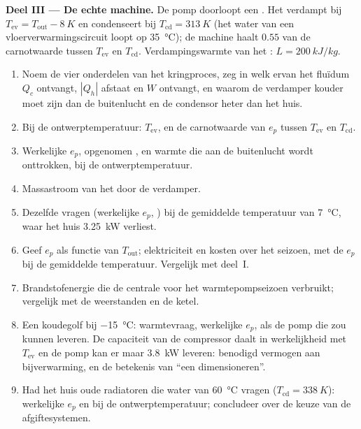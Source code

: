 \begin{problem}
\medskip
\noindent\textbf{Deel III --- De echte machine.}
De pomp doorloopt een . Het  verdampt bij
$T_{\mathrm{ev}} = T_{\mathrm{out}} - \qty{8}{K}$ en condenseert bij
$T_{\mathrm{cd}} = \qty{313}{K}$ (het water van een vloerverwarmingscircuit loopt op
\qty{35}{\degreeCelsius}); de machine haalt $0.55$ van de carnotwaarde
tussen $T_{\mathrm{ev}}$ en $T_{\mathrm{cd}}$. Verdampingswarmte van
het : $L = \qty{200}{kJ/kg}$.
\begin{enumerate}[resume]
  \item Noem de vier onderdelen van het kringproces, zeg in welk ervan het fluïdum
        $Q_c$ ontvangt, $|Q_h|$ afstaat en $W$ ontvangt, en waarom de
        verdamper kouder moet zijn dan de buitenlucht en de
        condensor heter dan het huis.
  \item Bij de ontwerptemperatuur: $T_{\mathrm{ev}}$, en de carnotwaarde van $e_p$
        tussen $T_{\mathrm{ev}}$ en $T_{\mathrm{cd}}$.
  \item Werkelijke $e_p$, opgenomen , en warmte die aan de
        buitenlucht wordt onttrokken, bij de ontwerptemperatuur.
  \item Massastroom van het  door de verdamper.
  \item Dezelfde vragen (werkelijke $e_p$, ) bij de gemiddelde
        temperatuur van \qty{7}{\degreeCelsius}, waar het huis
        \qty{3.25}{kW} verliest.
  \item Geef $e_p$ als functie van $T_{\mathrm{out}}$; elektriciteit en kosten
        over het seizoen, met de $e_p$ bij de gemiddelde temperatuur.
        Vergelijk met deel~I.
  \item Brandstofenergie die de centrale voor het warmtepompseizoen
        verbruikt; vergelijk met de weerstanden en de ketel.
  \item Een koudegolf bij \qty{-15}{\degreeCelsius}: warmtevraag, werkelijke $e_p$,
         als de pomp die zou kunnen leveren. De capaciteit van de compressor
        daalt in werkelijkheid met $T_{\mathrm{ev}}$ en de pomp kan er maar
        \qty{3.8}{kW} leveren: benodigd vermogen aan bijverwarming, en
        de betekenis van ``een  dimensioneren''.
  \item Had het huis oude radiatoren die water van
        \qty{60}{\degreeCelsius} vragen ($T_{\mathrm{cd}} = \qty{338}{K}$): werkelijke $e_p$
        en  bij de ontwerptemperatuur; concludeer over de
        keuze van de afgiftesystemen.
\end{enumerate}


\end{problem}
